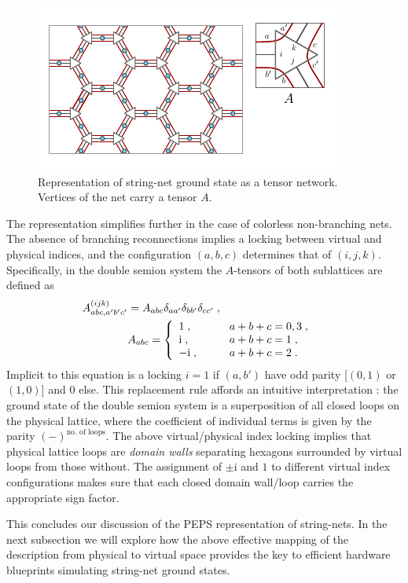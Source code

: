 \documentclass[twocolumn,floats,prx,showpacs]{revtex4-1}
\begin{document}
\begin{figure}
\includegraphics[width=1\columnwidth]{fig/ATensorDef.pdf}
\caption{Representation of string-net ground state as a tensor network. Vertices of the net carry a tensor $A$. }
\label{fig:ATensorDef}
\end{figure}

The representation simplifies further in the case of colorless non-branching nets. The absence of branching reconnections implies a locking between virtual and physical indices, and the configuration $(a,b,c)$ determines that of $(i,j,k)$. Specifically, in the double semion system the $A$-tensors of both sublattices are defined as \cite{Gu2009}
\begin{align}
\label{eq:ATensorLWS}
A^{(ijk)}_{abc,a'b'c'}&=A_{abc}\delta_{aa'}\delta_{bb'}\delta_{cc'}\;,\cr
&A_{abc}=
\left\{\begin{array}{ll}
1\;,&\qquad a+b+c=0,3\;,\cr 
\mathrm i \;,&\qquad a+b+c=1\;,\cr 
-\mathrm i\;,&\qquad a+b+c=2\;.
\end{array}\right.
\end{align}
Implicit to this equation is a locking $i=1$ if $(a,b')$ have odd parity [$(0,1)$ or $(1,0)$] and $0$ else. This replacement rule affords an intuitive interpretation \cite{Gu2009}: the ground state of the double semion system is a superposition of all closed loops on the physical lattice, where the coefficient of individual terms is given by the parity $(-)^{\text{no. of loops}}$. The above virtual/physical index locking implies that physical lattice loops are \emph{domain walls} separating hexagons surrounded by virtual loops from those without. The assignment of $\pm \mathrm i$ and $1$ to different virtual index configurations makes sure that each closed domain wall/loop carries the appropriate sign factor.

This concludes our discussion of the PEPS representation of string-nets. In the next subsection we will explore how the above effective mapping of the description from physical to virtual space  provides the key to efficient hardware blueprints simulating string-net ground states.
\end{document}
